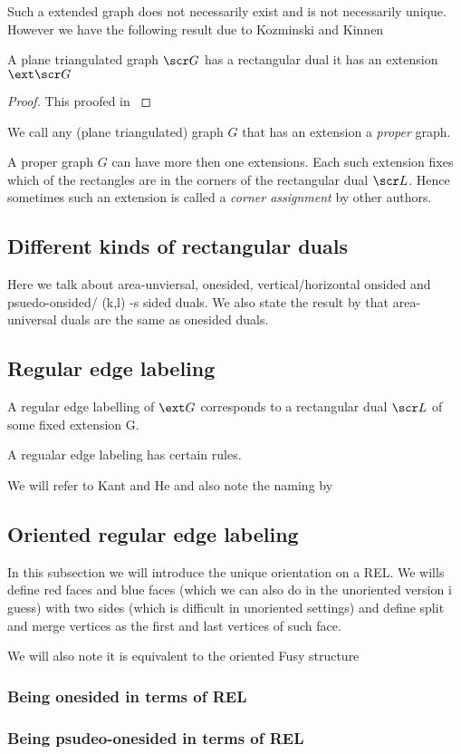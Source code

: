 Such a extended graph does not necessarily exist and is not necessarily unique.
However we have the following result due to Kozminski and Kinnen

\begin{thrm}
A plane triangulated graph $\G$ has a rectangular dual \ifftext it has an extension $\ext \G$
\end{thrm}

\begin{proof}
  This proofed in \cite{Kozminski1984} 
\end{proof}

We call any (plane triangulated) graph $G$ that has an extension a \emph{proper} graph.

A proper graph $G$ can have more then one extensions. Each such extension fixes which of the rectangles are in the corners of the rectangular dual $\L$. Hence sometimes such an extension is called a \emph{corner assignment} by other authors.

\subsection{Different kinds of rectangular duals}
Here we talk about area-unviersal, onesided, vertical/horizontal onsided and psuedo-onsided/ (k,l) -s sided duals.
We also state the result by \cite{Eppstein2012} that area-universal duals are the same as onesided duals.


\subsection{Regular edge labeling}

A regular edge labelling  of $\ext G$ corresponds to a rectangular dual $\L$ of some fixed extension \ext G.

A regualar edge labeling has certain rules.

We will refer to Kant and He \cite{Kant1997} and also note the naming by \cite{Fusy2006}


\subsection{Oriented regular edge labeling}
In this subsection we will introduce the unique orientation on a REL. We wills define red faces and blue faces (which we can also do in the unoriented version i guess) with two sides (which is difficult in unoriented settings) and define split and merge vertices as the first and last vertices of such face.

We will also note it is equivalent to the oriented Fusy structure

\subsubsection{Being onesided in terms of REL}

\subsubsection{Being psudeo-onesided in terms of REL}
